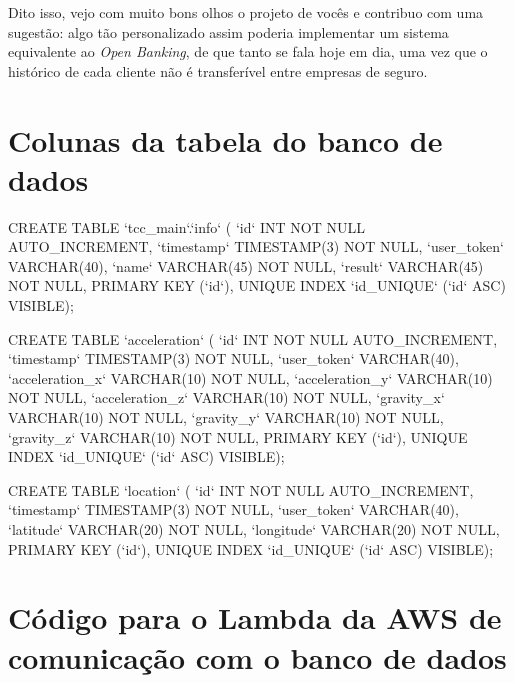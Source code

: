 Dito isso, vejo com muito bons olhos o projeto de vocês e contribuo com uma sugestão: algo tão personalizado assim poderia implementar um sistema equivalente ao \textit{Open Banking}, de que tanto se fala hoje em dia, uma vez que o histórico de cada cliente não é transferível entre empresas de seguro.



\section{Colunas da tabela do banco de dados}

\begin{python}
CREATE TABLE `tcc_main`.`info` (
  `id` INT NOT NULL AUTO_INCREMENT, 
  `timestamp` TIMESTAMP(3) NOT NULL,
  `user_token` VARCHAR(40),
  `name` VARCHAR(45) NOT NULL,
  `result` VARCHAR(45) NOT NULL,
  PRIMARY KEY (`id`),
  UNIQUE INDEX `id_UNIQUE` (`id` ASC) VISIBLE);

CREATE TABLE `acceleration` (
  `id` INT NOT NULL AUTO_INCREMENT,
  `timestamp` TIMESTAMP(3) NOT NULL,
  `user_token` VARCHAR(40),
  `acceleration_x` VARCHAR(10) NOT NULL,
  `acceleration_y` VARCHAR(10) NOT NULL,
  `acceleration_z` VARCHAR(10) NOT NULL,
  `gravity_x` VARCHAR(10) NOT NULL,
  `gravity_y` VARCHAR(10) NOT NULL,
  `gravity_z` VARCHAR(10) NOT NULL,
  PRIMARY KEY (`id`),
  UNIQUE INDEX `id_UNIQUE` (`id` ASC) VISIBLE);

CREATE TABLE `location` (
  `id` INT NOT NULL AUTO_INCREMENT,
  `timestamp` TIMESTAMP(3) NOT NULL,
  `user_token` VARCHAR(40),
  `latitude` VARCHAR(20) NOT NULL,
  `longitude` VARCHAR(20) NOT NULL,
  PRIMARY KEY (`id`),
  UNIQUE INDEX `id_UNIQUE` (`id` ASC) VISIBLE);

\end{python}





\section{Código para o Lambda da AWS de comunicação com o banco de dados}

